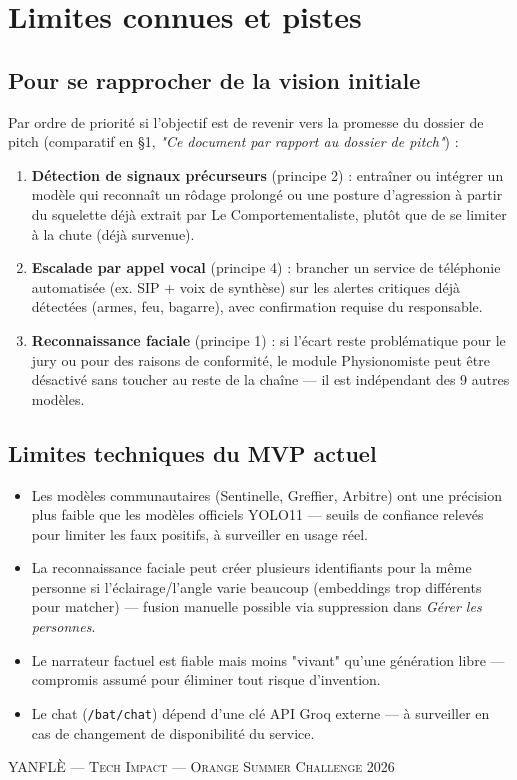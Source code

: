 \documentclass[11pt,a4paper]{article}
\begin{document}
\section{Limites connues et pistes}

\subsection*{Pour se rapprocher de la vision initiale}

Par ordre de priorit\'e si l'objectif est de revenir vers la promesse du dossier de pitch
(comparatif en \S1, \emph{"Ce document par rapport au dossier de pitch"}) :

\begin{enumerate}[leftmargin=1.2em, itemsep=3pt]
  \item \textbf{D\'etection de signaux pr\'ecurseurs} (principe 2) : entra\^iner ou int\'egrer un
  mod\`ele qui reconna\^it un r\^odage prolong\'e ou une posture d'agression \`a partir du squelette
  d\'ej\`a extrait par Le Comportementaliste, plut\^ot que de se limiter \`a la chute (d\'ej\`a
  survenue).
  \item \textbf{Escalade par appel vocal} (principe 4) : brancher un service de t\'el\'ephonie
  automatis\'ee (ex. SIP + voix de synth\`ese) sur les alertes critiques d\'ej\`a d\'etect\'ees
  (armes, feu, bagarre), avec confirmation requise du responsable.
  \item \textbf{Reconnaissance faciale} (principe 1) : si l'\'ecart reste probl\'ematique pour le jury
  ou pour des raisons de conformit\'e, le module Physionomiste peut \^etre d\'esactiv\'e sans toucher
  au reste de la cha\^ine --- il est ind\'ependant des 9 autres mod\`eles.
\end{enumerate}

\subsection*{Limites techniques du MVP actuel}

\begin{itemize}[leftmargin=1.2em, itemsep=3pt]
  \item Les mod\`eles communautaires (Sentinelle, Greffier, Arbitre) ont une pr\'ecision plus faible que
  les mod\`eles officiels YOLO11 — seuils de confiance relev\'es pour limiter les faux positifs, \`a
  surveiller en usage r\'eel.
  \item La reconnaissance faciale peut cr\'eer plusieurs identifiants pour la m\^eme personne si
  l'\'eclairage/l'angle varie beaucoup (embeddings trop diff\'erents pour matcher) — fusion manuelle
  possible via suppression dans \emph{G\'erer les personnes}.
  \item Le narrateur factuel est fiable mais moins "vivant" qu'une g\'en\'eration libre — compromis
  assum\'e pour \'eliminer tout risque d'invention.
  \item Le chat (\texttt{/bat/chat}) d\'epend d'une cl\'e API Groq externe — \`a surveiller en cas de
  changement de disponibilit\'e du service.
\end{itemize}

\vspace{1em}
\begin{center}
\small\color{ykgray}\textsc{YANFL\`E --- Tech Impact --- Orange Summer Challenge 2026}
\end{center}
\end{document}

